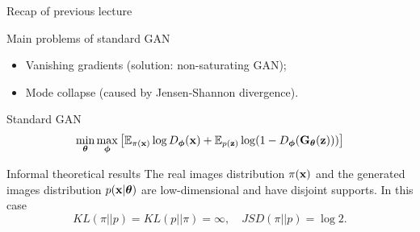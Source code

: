 \begin{frame}{Recap of previous lecture}
	\begin{block}{Main problems of standard GAN}
		\begin{itemize}
			\item Vanishing gradients (solution: non-saturating GAN);
			\item Mode collapse (caused by Jensen-Shannon divergence).
		\end{itemize}
	\end{block}
	\begin{block}{Standard GAN}
		\vspace{-0.2cm}
		\[
		\min_{\boldsymbol{\theta}} \max_{\boldsymbol{\phi}} \left[ \mathbb{E}_{\pi(\mathbf{x})} \log D_{\boldsymbol{\phi}}(\mathbf{x}) + \mathbb{E}_{p(\mathbf{z})} \log (1 - D_{\boldsymbol{\phi}}(\mathbf{G}_{\boldsymbol{\theta}}(\mathbf{z}))) \right]
		\]
		\vspace{-0.4cm}
	\end{block}
	\vspace{-0.1cm}
	\begin{block}{Informal theoretical results}
		The real images distribution $\pi(\mathbf{x})$ and the generated images distribution $p(\mathbf{x} | \boldsymbol{\theta})$ are low-dimensional and have disjoint supports. In this case
		\vspace{-0.3cm}
		\[
		KL(\pi || p) = KL(p || \pi) = \infty, \quad JSD(\pi || p) = \log 2.
		\]
	\end{block}
\end{frame}
